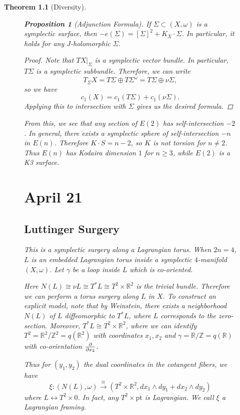 \documentclass[leqno, openany]{memoir}
\newtheorem{thm}{Theorem}[chapter]
\newtheorem{prop}[thm]{Proposition}
\theoremstyle{definition}
\theoremstyle{remark}
\theoremstyle{plain}
\theoremstyle{definition}
\theoremstyle{remark}
\newcommand{\R}{\mathbb{R}}
\newcommand{\Z}{\mathbb{Z}}
\newcommand{\mr}[1]{\mathrm{#1}}
\begin{document}
\begin{thm}[Diversity]
\begin{figure}[H]
    \begin{prop}[Adjunction Formula] If $\Sigma \subset (X, \omega)$ is a
    symplectic surface, then $-e(\Sigma) = [\Sigma]^2 + K_X \cdot \Sigma$. In
particular, it holds for any $J$-holomorphic $\Sigma$.  \end{prop}

    \begin{proof} Note that $TX|_{\Sigma}$ is a symplectic vector bundle. In
        particular, $T \Sigma$ is a symplectic subbundle. Therefore, we can
        write \[ T_{\Sigma} X = T \Sigma \oplus T \Sigma^{\omega} = T \Sigma
        \oplus \nu \Sigma, \] so we have \[ c_1(X) = c_1(T \Sigma) + c_1(\nu
    \Sigma). \] Applying this to intersection with $\Sigma$ gives us the
desired formula.  \end{proof}

    From this, we see that any section of $E(2)$ has self-intersection $-2$. In
    general, there exists a symplectic sphere of self-intersection $-n$ in
    $E(n)$. Therefore $K \cdot S = n-2$, so $K$ is not torsion for $n \neq 2$.
    Thus $E(n)$ has Kodaira dimension $1$ for $n \geq 3$, while $E(2)$ is a K3
    surface.

    \chapter{April 21}%
    
    \section{Luttinger Surgery}%
    
    This is a symplectic surgery along a Lagrangian torus. When $2n = 4$, $L$
    is an embedded Lagrangian torus inside a symplectic $4$-manifold $(X,
    \omega)$. Let $\gamma$ be a loop inside $L$ which is co-oriented.

    Here $N(L) \cong \nu L \cong T^*L \cong T^2 \times \R^2$ is the trivial
    bundle. Therefore we can perform a torus surgery along $L$ in $X$. To
    construct an explicit model, note that by Weinstein, there exists a
    neighborhood $N(L)$ of $L$ diffeomorphic to $T^*L$, where $L$ corresponds
    to the zero-section. Moreover, $T^*L \cong T^2 \times \R^2$, where we can
    identify $T^2 = \R^2/\Z^2 = q(\R^2)$ with coordinates $x_1, x_2$ and
    $\gamma = \R/\Z = q(\R)$ with co-orientation $\pdv{x_2}$.

    Thus for $(y_1, y_2)$ the dual coordinates in the cotangent fibers, we have
    \[ \xi: (N(L), \omega) \xrightarrow{\cong} (T^2 \times \R^2, dx_1 \wedge
    dy_1 + dx_2 \wedge dy_2) \] where $L \longleftrightarrow T^2 \times 0$. In
    fact, any $T^2 \times \mr{pt}$ is Lagrangian. We call $\xi$ a
    \textit{Lagrangian framing}.


\end{figure}
\end{thm}
\end{document}
